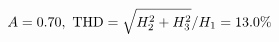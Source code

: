 \documentclass[preview]{standalone}
\begin{document}
\begin{align*}
\special{dvisvgm:raw <g id='unique000'>}A=0.70,\ \text{THD}=\sqrt{H_2^2+H_3^2}/H_1=13.0\%\special{dvisvgm:raw </g>}
\end{align*}
\end{document}

